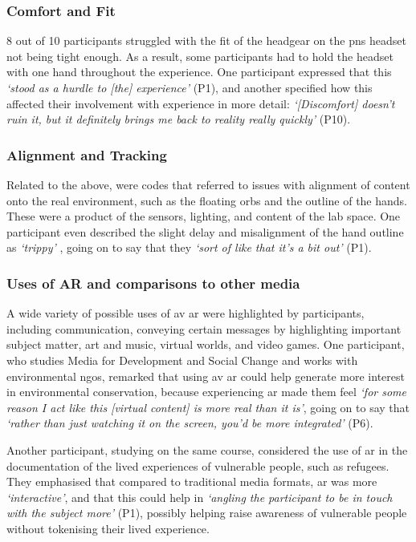 \subsubsection{Comfort and Fit}\label{sec: polaris-feedback-adoption-comfort}
8 out of 10 participants struggled with the fit of the headgear on the \gls{pns} headset not being tight enough. As a result, some participants had to hold the headset with one hand throughout the experience. One participant expressed that this \textit{`stood as a hurdle to [the] experience'} (P1), and another specified how this affected their involvement with experience in more detail: \textit{`[Discomfort] doesn't ruin it, but it definitely brings me back to reality really quickly'} (P10).
\subsubsection{Alignment and Tracking}\label{sec: polaris-feedback-adoption-alignment}
Related to the above, were codes that referred to issues with alignment of content onto the real environment, such as the floating orbs and the outline of the hands. These were a product of the sensors, lighting, and content of the lab space. One participant even described the slight delay and misalignment of the hand outline as \textit{`trippy'} , going on to say that they \textit{`sort of like that it's a bit out'} (P1).

\subsubsection{Uses of AR and comparisons to other media}\label{sec: polaris-feedback-adoption-uses}
A wide variety of possible uses of \gls{av} \gls{ar} were highlighted by participants, including communication, conveying certain messages by highlighting important subject matter, art and music, virtual worlds, and video games.
One participant, who studies Media for Development and Social Change and works with environmental \glspl{ngo}, remarked that using \gls{av} \gls{ar} could help generate more interest in environmental conservation, because experiencing \gls{ar} made them feel \textit{`for some reason I act like this [virtual content] is more real than it is'}, going on to say that \textit{`rather than just watching it on the screen, you'd be more integrated'} (P6).

Another participant, studying on the same course, considered the use of \gls{ar} in the documentation of the lived experiences of vulnerable people, such as refugees. They emphasised that compared to traditional media formats, \gls{ar} was more \textit{`interactive'}, and that this could help in \textit{`angling the participant to be in touch with the subject more'} (P1), possibly helping raise awareness of vulnerable people without tokenising their lived experience.

